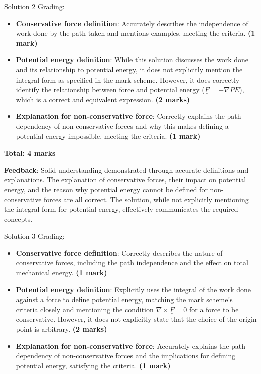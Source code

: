 \documentclass[a4paper,11pt]{article}
\begin{document}
Solution 2 Grading:

\begin{itemize}
    \item \textbf{Conservative force definition}: Accurately describes the independence of work done by the path taken and mentions examples, meeting the criteria. \textbf{(1 mark)}
    \item \textbf{Potential energy definition}: While this solution discusses the work done and its relationship to potential energy, it does not explicitly mention the integral form as specified in the mark scheme. However, it does correctly identify the relationship between force and potential energy (\( \underline{F} = -\nabla PE \)), which is a correct and equivalent expression. \textbf{(2 marks)}
    \item \textbf{Explanation for non-conservative force}: Correctly explains the path dependency of non-conservative forces and why this makes defining a potential energy impossible, meeting the criteria. \textbf{(1 mark)}
\end{itemize}

\textbf{Total: 4 marks}

\textbf{Feedback}: Solid understanding demonstrated through accurate definitions and explanations. The explanation of conservative forces, their impact on potential energy, and the reason why potential energy cannot be defined for non-conservative forces are all correct. The solution, while not explicitly mentioning the integral form for potential energy, effectively communicates the required concepts.

Solution 3 Grading:

\begin{itemize}
    \item \textbf{Conservative force definition}: Correctly describes the nature of conservative forces, including the path independence and the effect on total mechanical energy. \textbf{(1 mark)}
    \item \textbf{Potential energy definition}: Explicitly uses the integral of the work done against a force to define potential energy, matching the mark scheme's criteria closely and mentioning the condition \( \nabla \times \underline{F} = 0 \) for a force to be conservative. However, it does not explicitly state that the choice of the origin point is arbitrary. \textbf{(2 marks)}
    \item \textbf{Explanation for non-conservative force}: Accurately explains the path dependency of non-conservative forces and the implications for defining potential energy, satisfying the criteria. \textbf{(1 mark)}
\end{itemize}
\end{document}

